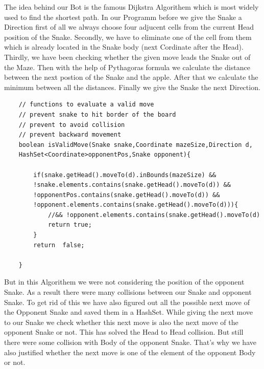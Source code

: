 \documentclass[a4paper,12pt]{article}
\begin{document}
The idea behind our Bot is the famous Dijkstra Algorithem which is most widely used to find the shortest path.
In our Programm before we give the Snake a Direction first of all we  always choose four adjucent cells from the current
Head position of the Snake. Secondly, we have to eliminate one of the cell from them which is already located in the Snake
body (next Cordinate after the Head). Thirdly, we have been checking whether the given move leads the Snake out of the Maze.
Then with the help of Pythagoras formula we calculate the distance between the next postion of the Snake  and the apple.
After that we calculate the minimum between all the distances. Finally we give the Snake the next Direction.
\begin{verbatim}
    // functions to evaluate a valid move
    // prevent snake to hit border of the board
    // prevent to avoid collision
    // prevent backward movement
    boolean isValidMove(Snake snake,Coordinate mazeSize,Direction d,
	HashSet<Coordinate>opponentPos,Snake opponent){

        if(snake.getHead().moveTo(d).inBounds(mazeSize) && 
		!snake.elements.contains(snake.getHead().moveTo(d)) && 
        !opponentPos.contains(snake.getHead().moveTo(d)) && 
		!opponent.elements.contains(snake.getHead().moveTo(d))){
            //&& !opponent.elements.contains(snake.getHead().moveTo(d)
            return true;
        }
        return  false;

    }
\end{verbatim}
But in this Algorithem we were not considering the position of the opponent Snake. As a result there were many collisions between our Snake and opponent 
Snake. To get rid of this we have also figured out all the possible next move of the Opponent Snake and saved them in a HashSet. While giving the next move 
to our Snake we check whether this next move is also the next move of the opponent Snake or not. This has solved the Head to Head collision. But still there were some 
collision with Body of the opponent Snake. That's why we have also justified whether the next move is one of the element of the opponent Body or not.
\end{document}
